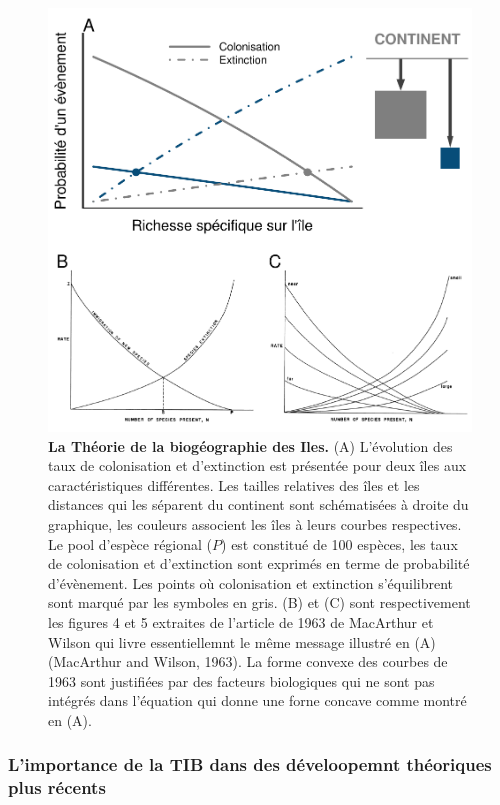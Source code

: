\begin{figure}[htbp]
\centering
\includegraphics{fig/fig1.pdf}
\caption{\textbf{La Théorie de la biogéographie des Iles.} (A)
L'évolution des taux de colonisation et d'extinction est présentée pour
deux îles aux caractéristiques différentes. Les tailles relatives des
îles et les distances qui les séparent du continent sont schématisées à
droite du graphique, les couleurs associent les îles à leurs courbes
respectives. Le pool d'espèce régional (\(P\)) est constitué de 100
espèces, les taux de colonisation et d'extinction sont exprimés en terme
de probabilité d'évènement. Les points où colonisation et extinction
s'équilibrent sont marqué par les symboles en gris. (B) et (C) sont
respectivement les figures 4 et 5 extraites de l'article de 1963 de
MacArthur et Wilson qui livre essentiellemnt le même message illustré en
(A) (MacArthur and Wilson, 1963). La forme convexe des courbes de 1963
sont justifiées par des facteurs biologiques qui ne sont pas intégrés
dans l'équation \label{eqMW} qui donne une forne concave comme montré en
(A).\label{fig:figMW}}
\end{figure}

\subsubsection*{L'importance de la TIB dans des déveloopemnt théoriques
plus
récents}\label{limportance-de-la-tib-dans-des-duxe9veloopemnt-thuxe9oriques-plus-ruxe9cents}

